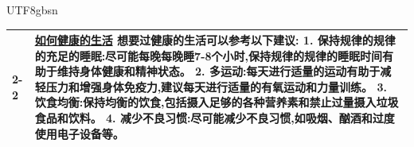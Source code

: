 \begin{CJK*}{UTF8}{gbsn}
\begin{table}[t]
{\begin{tabular}{p{0.8cm}|p{9.8cm}}
        \cmidrule{2-2}
        & \underline{如何健康的生活} 想要过健康的生活可以参考以下建议: 1. 保持规律的规律的充足的睡眠:尽可能每晚每晚睡7-8个小时,保持规律的规律的睡眠时间有助于维持身体健康和精神状态。 2. 多运动:每天进行适量的运动有助于减轻压力和增强身体免疫力,建议每天进行适量的有氧运动和力量训练。 3. 饮食均衡:保持均衡的饮食,包括摄入足够的各种营养素和禁止过量摄入垃圾食品和饮料。 4. 减少不良习惯:尽可能减少不良习惯,如吸烟、酗酒和过度使用电子设备等。\\
        \bottomrule
    \end{tabular}
    }
\end{table}
\end{CJK*}
